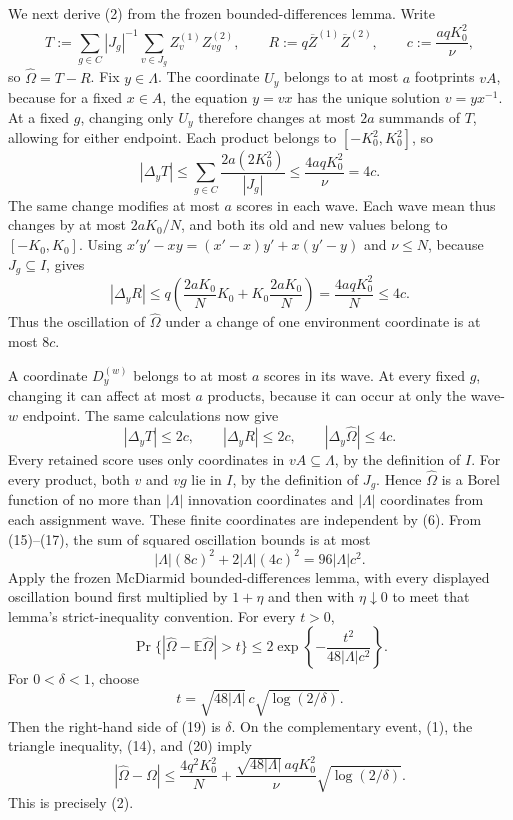 We next derive (2) from the frozen bounded-differences lemma.  Write
\[
 T:=\sum_{g\in C}|J_g|^{-1}\sum_{v\in J_g}
 Z_v^{(1)}Z_{vg}^{(2)},
 \qquad
 R:=q\overline Z^{(1)}\overline Z^{(2)},
 \qquad
 c:=\frac{aqK_0^2}{\nu}, \tag{14}
\]
so \(\widehat\Omega=T-R\).  Fix \(y\in\Lambda\).  The coordinate \(U_y\) belongs to at most \(a\) footprints \(vA\), because for a fixed \(x\in A\), the equation \(y=vx\) has the unique solution \(v=yx^{-1}\).  At a fixed \(g\), changing only \(U_y\) therefore changes at most \(2a\) summands of \(T\), allowing for either endpoint.  Each product belongs to \([-K_0^2,K_0^2]\), so
\[
 |\Delta_yT|
 \le\sum_{g\in C}\frac{2a(2K_0^2)}{|J_g|}
 \le\frac{4aqK_0^2}{\nu}=4c. \tag{15}
\]
The same change modifies at most \(a\) scores in each wave.  Each wave mean thus changes by at most \(2aK_0/N\), and both its old and new values belong to \([-K_0,K_0]\).  Using \(x'y'-xy=(x'-x)y'+x(y'-y)\) and \(\nu\le N\), because \(J_g\subseteq I\), gives
\[
 |\Delta_yR|
 \le q\left(\frac{2aK_0}{N}K_0
             +K_0\frac{2aK_0}{N}\right)
 =\frac{4aqK_0^2}{N}
 \le4c. \tag{16}
\]
Thus the oscillation of \(\widehat\Omega\) under a change of one environment coordinate is at most \(8c\).

A coordinate \(D_y^{(w)}\) belongs to at most \(a\) scores in its wave.  At every fixed \(g\), changing it can affect at most \(a\) products, because it can occur at only the wave-\(w\) endpoint.  The same calculations now give
\[
 |\Delta_yT|\le2c,
 \qquad
 |\Delta_yR|\le2c,
 \qquad
 |\Delta_y\widehat\Omega|\le4c. \tag{17}
\]
Every retained score uses only coordinates in \(vA\subseteq\Lambda\), by the definition of \(I\).  For every product, both \(v\) and \(vg\) lie in \(I\), by the definition of \(J_g\).  Hence \(\widehat\Omega\) is a Borel function of no more than \(|\Lambda|\) innovation coordinates and \(|\Lambda|\) coordinates from each assignment wave.  These finite coordinates are independent by (6).  From (15)--(17), the sum of squared oscillation bounds is at most
\[
 |\Lambda|(8c)^2+2|\Lambda|(4c)^2
 =96|\Lambda|c^2. \tag{18}
\]
Apply the frozen McDiarmid bounded-differences lemma, with every displayed oscillation bound first multiplied by \(1+\eta\) and then with \(\eta\downarrow0\) to meet that lemma's strict-inequality convention.  For every \(t>0\),
\[
 \Pr\{ |\widehat\Omega-\mathbb E\widehat\Omega|>t\}
 \le2\exp\!\left\{-\frac{t^2}{48|\Lambda|c^2}\right\}. \tag{19}
\]
For \(0<\delta<1\), choose
\[
 t=\sqrt{48|\Lambda|}\,c\sqrt{\log(2/\delta)}. \tag{20}
\]
Then the right-hand side of (19) is \(\delta\).  On the complementary event, (1), the triangle inequality, (14), and (20) imply
\[
 |\widehat\Omega-\Omega|
 \le \frac{4q^2K_0^2}{N}
 +\frac{\sqrt{48|\Lambda|}\,aqK_0^2}{\nu}
   \sqrt{\log(2/\delta)}.
\]
This is precisely (2).

